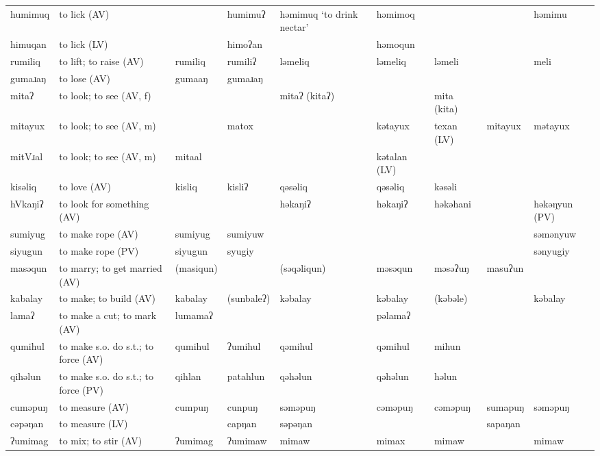 \begin{landscape}
\begin{longtable}{*{9}{>{\raggedright\arraybackslash}p{}}}
\text{*}humimuq      & to lick (AV) &  & humimuʔ & həmimuq `to drink nectar' & həmimoq &  &  & həmimu\\
\text{*}himuqan      & to lick (LV) &  & himoʔan &  & həmoqun &  &  & \\
\text{*}rumiliq      & to lift; to raise (AV) & rumiliq & rumiliʔ & ləmeliq & ləmeliq & ləmeli &  & meli\\
\text{*}gumaɹaŋ      & to lose (AV) & gumaaŋ & gumaɹaŋ &  &  &  &  & \\
\text{*}mitaʔ        & to look; to see (AV, f) &  &  & mitaʔ (kitaʔ) &  & mita (kita) &  & \\
\text{*}mitayux      & to look; to see (AV, m) &  & matox &  & kətayux & texan (LV) & mitayux & mətayux\\
\text{*}mitVɹal      & to look; to see (AV, m) & mitaal &  &  & kətalan (LV) &  &  & \\
\text{*}kisəliq      & to love (AV) & kisliq & kisliʔ & qəsəliq & qəsəliq & kəsəli &  & \\
\text{*}hVkaŋiʔ      & to look for something (AV) &  &  & həkaŋiʔ & həkaŋiʔ & həkəhani &  & həkəŋyun (PV)\\
\text{*}sumiyug      & to make rope (AV) & sumiyug & sumiyuw &  &  &  &  & səmənyuw\\
\text{*}siyugun      & to make rope (PV) & siyugun & syugiy &  &  &  &  & sənyugiy\\
\text{*}masəqun      & to marry; to get married (AV) & (masiqun) &  & (səqəliqun) & məsəqun & məsəʔuŋ & masuʔun & \\
\text{*}kabalay      & to make; to build (AV) & kabalay & (sunbaleʔ) & kəbalay & kəbalay & (kəbəle) &  & kəbalay\\
\text{*}lamaʔ       & to make a cut; to mark (AV) & lumamaʔ &  &  & pəlamaʔ &  &  & \\
\text{*}qumihul      & to make s.o. do s.t.; to force (AV) & qumihul & ʔumihul & qəmihul & qəmihul & mihun &  & \\
\text{*}qihəlun      & to make s.o. do s.t.; to force (PV) & qihlan & patahlun & qəhəlun & qəhəlun & həlun &  & \\
\text{*}cuməpuŋ      & to measure (AV) & cumpuŋ & cunpuŋ & səməpuŋ & cəməpuŋ & cəməpuŋ & sumapuŋ & səməpuŋ\\
\text{*}cəpəŋan      & to measure (LV) &  & capŋan & səpəŋan &  &  & sapaŋan & \\
\text{*}ʔumimag      & to mix; to stir (AV) & ʔumimag & ʔumimaw & mimaw & mimax & mimaw &  & mimaw\\

\end{longtable}
\end{landscape}
